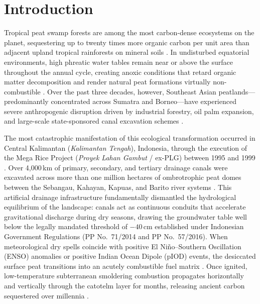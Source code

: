 \section{Introduction}
\label{sec:introduction}

Tropical peat swamp forests are among the most carbon-dense ecosystems on the planet, sequestering up to twenty times more organic carbon per unit area than adjacent upland tropical rainforests on mineral soils \citep{Page2002Nature, Dommain2011ProcRSocB}. In undisturbed equatorial environments, high phreatic water tables remain near or above the surface throughout the annual cycle, creating anoxic conditions that retard organic matter decomposition and render natural peat formations virtually non-combustible \citep{Wosten2008Geoderma, Dadap2021NatComm}. Over the past three decades, however, Southeast Asian peatlands---predominantly concentrated across Sumatra and Borneo---have experienced severe anthropogenic disruption driven by industrial forestry, oil palm expansion, and large-scale state-sponsored canal excavation schemes \citep{Miettinen2016ERL, Dohong2017RestorEcol, Langner2007IJWF, Carlson2012PNAS}.

The most catastrophic manifestation of this ecological transformation occurred in Central Kalimantan (\textit{Kalimantan Tengah}), Indonesia, through the execution of the Mega Rice Project (\textit{Proyek Lahan Gambut} / ex-PLG) between 1995 and 1999 \citep{Silvius2005Wetlands}. Over 4,000\,km of primary, secondary, and tertiary drainage canals were excavated across more than one million hectares of ombrotrophic peat domes between the Sebangau, Kahayan, Kapuas, and Barito river systems \citep{Ritzema2014HESS}. This artificial drainage infrastructure fundamentally dismantled the hydrological equilibrium of the landscape: canals act as continuous conduits that accelerate gravitational discharge during dry seasons, drawing the groundwater table well below the legally mandated threshold of $-40$\,cm established under Indonesian Government Regulations (PP No.~71/2014 and PP No.~57/2016). When meteorological dry spells coincide with positive El Ni\~no--Southern Oscillation (ENSO) anomalies or positive Indian Ocean Dipole (pIOD) events, the desiccated surface peat transitions into an acutely combustible fuel matrix \citep{Cochrane2003Nature, Hooijer2012Biogeosciences, Field2016PNAS}. Once ignited, low-temperature subterranean smoldering combustion propagates horizontally and vertically through the catotelm layer for months, releasing ancient carbon sequestered over millennia \citep{Usup2004Tropics, Wooster2018NatGeosci, Vetrita2020RemoteSensing}.

